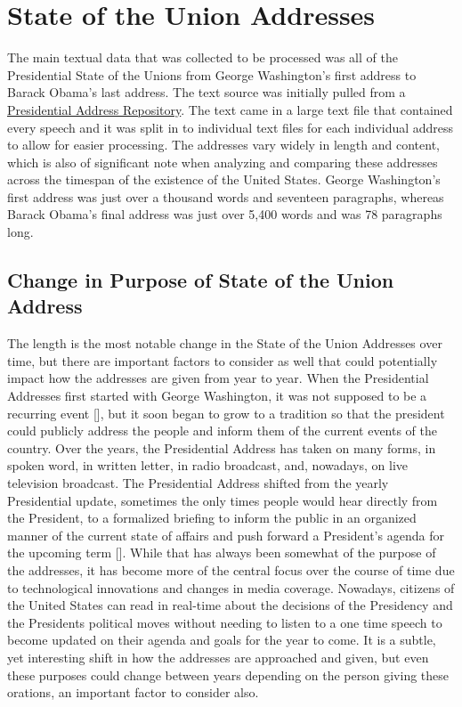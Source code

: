 \section{State of the Union Addresses}
The main textual data that was collected to be processed was all of the Presidential State of the Unions from George Washington's first address to Barack Obama's last address.
The text source was initially pulled from a \href{http://stateoftheunion.onetwothree.net/appendices.html#source}{Presidential Address Repository}.
The text came in a large text file that contained every speech and it was split in to individual text files for each individual address to allow for easier processing.
The addresses vary widely in length and content, which is also of significant note when analyzing and comparing these addresses across the timespan of the existence of the United States.
George Washington's first address was just over a thousand words and seventeen paragraphs, whereas Barack Obama's final address was just over 5,400 words and was 78 paragraphs long.

\subsection{Change in Purpose of State of the Union Address}
The length is the most notable change in the State of the Union Addresses over time, but there are important factors to consider as well that could potentially impact how the addresses are given from year to year.
When the Presidential Addresses first started with George Washington, it was not supposed to be a recurring event [\cite{teten2003evolution}], but it soon began to grow to a tradition so that the president could publicly address the people and inform them of the current events of the country.
Over the years, the Presidential Address has taken on many forms, in spoken word, in written letter, in radio broadcast, and, nowadays, on live television broadcast.
The Presidential Address shifted from the yearly Presidential update, sometimes the only times people would hear directly from the President, to a formalized briefing to inform the public in an organized manner of the current state of affairs and push forward a President's agenda for the upcoming term [\cite{teten2003evolution}].
While that has always been somewhat of the purpose of the addresses, it has become more of the central focus over the course of time due to technological innovations and changes in media coverage.
Nowadays, citizens of the United States can read in real-time about the decisions of the Presidency and the Presidents political moves without needing to listen to a one time speech to become updated on their agenda and goals for the year to come.
It is a subtle, yet interesting shift in how the addresses are approached and given, but even these purposes could change between years depending on the person giving these orations, an important factor to consider also.

